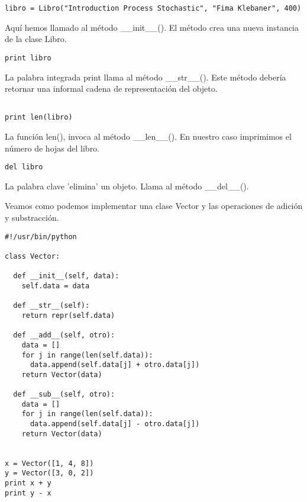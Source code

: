 \documentclass[twoside,10.5pt]{article}%
\begin{document}
\begin{verbatim}
libro = Libro("Introduction Process Stochastic", "Fima Klebaner", 400)
\end{verbatim}

Aqu\'i hemos llamado al m\'etodo {\color{blue}\_\_init\_\_()}. El m\'etodo crea una nueva instancia de la clase Libro.

\begin{verbatim}
print libro
\end{verbatim}

La palabra integrada print llama al m\'etodo {\color{blue}\_\_str\_\_()}. Este m\'etodo deber\'ia retornar una informal cadena de representaci\'on del objeto.

\begin{verbatim}

print len(libro)
\end{verbatim}

La funci\'on len(), invoca al m\'etodo {\color{blue}\_\_len\_\_()}. En nuestro caso imprimimos el n\'umero de hojas del libro.


\begin{verbatim}
del libro
\end{verbatim}

La palabra clave 'elimina' un objeto. Llama al m\'etodo {\color{blue}\_\_del\_\_()}.


\vspace{0.3cm}


Veamos como podemos implementar una clase Vector y las operaciones de adici\'on y substracci\'on.


\begin{verbatim}
#!/usr/bin/python

class Vector:

  def __init__(self, data):
    self.data = data

  def __str__(self):
    return repr(self.data)

  def __add__(self, otro):
    data = []
    for j in range(len(self.data)):
      data.append(self.data[j] + otro.data[j])
    return Vector(data)

  def __sub__(self, otro):
    data = []
    for j in range(len(self.data)):
      data.append(self.data[j] - otro.data[j])
    return Vector(data)


x = Vector([1, 4, 8])
y = Vector([3, 0, 2])
print x + y
print y - x
\end{verbatim}


\vspace{0.3cm}
\end{document}
